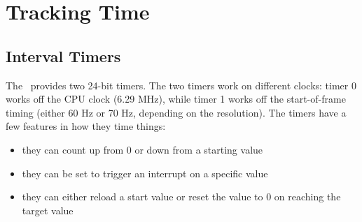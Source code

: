 \chapter{Tracking Time}

\section*{Interval Timers}

The \jr\ provides two 24-bit timers. The two timers work on different clocks: timer 0 works off the CPU clock (6.29 MHz), while timer 1 works off the start-of-frame timing (either 60 Hz or 70 Hz, depending on the resolution). The timers have a few features in how they time things:

\begin{itemize}
    \item they can count up from 0 or down from a starting value

    \item they can be set to trigger an interrupt on a specific value

    \item they can either reload a start value or reset the value to 0 on reaching the target value
\end{itemize}

